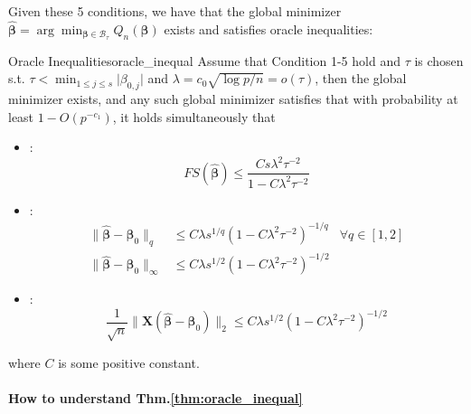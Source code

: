 \documentclass[twoside]{article}
\begin{document}
Given these 5 conditions, we have that the global minimizer $\hat{\boldsymbol{\beta}} = \arg \min_{\boldsymbol{\beta}\in \mathcal{B}_{\tau}}Q_n(\boldsymbol{\beta})$ exists and satisfies oracle inequalities:
\begin{theorem}{Oracle Inequalities}{oracle_inequal}
    Assume that Condition 1-5 hold and $\tau$ is chosen s.t. $\tau < \min_{1\leq j \leq s}\lvert \beta_{0,j} \rvert$ and $\lambda = c_0\sqrt{\log p/n} = o(\tau)$, then the global minimizer exists, and any such global minimizer satisfies that with probability at least $1-O(p^{-c_1})$, it holds simultaneously that 
    \begin{itemize}
        \item {}: $$FS(\hat{\boldsymbol{\beta}}) \leq \frac{Cs \lambda^2 \tau^{-2}}{1-C\lambda^2\tau^{-2}}$$
        \item {}: 
        \begin{align*}
            \lVert \hat{\boldsymbol{\beta}} - \boldsymbol{\beta}_0\rVert _q &\leq C\lambda s^{1/q} (1-C\lambda^2\tau^{-2})^{-1/q} &\forall q\in [1,2]\\
            \lVert \hat{\boldsymbol{\beta}} - \boldsymbol{\beta}_0\rVert _{\infty} &\leq C\lambda s^{1/2} (1-C\lambda^2\tau^{-2})^{-1/2}
        \end{align*}
        \item {}: $$\frac{1}{\sqrt{n}} \lVert \mathbf{X}\left(\hat{\boldsymbol{\beta}} - \boldsymbol{\beta}_0\right)\rVert _2 \leq C\lambda s^{1/2} (1-C\lambda^2\tau^{-2})^{-1/2}  $$
    \end{itemize}
    where $C$ is some positive constant.
\end{theorem}
\paragraph*{How to understand Thm.\ref{thm:oracle_inequal}}

\newpage


\end{document}
